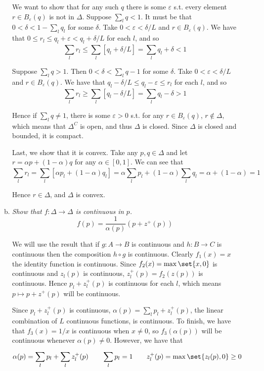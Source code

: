 \documentclass{article}
\begin{document}
\begin{enumerate}[1.]
\begin{enumerate}[a)]
        We want to show that for any such $q$ there is some $\varepsilon$ s.t. every element $r \in B_{\varepsilon}(q)$ is not in $\Delta$. Suppose $\sum^{}_{l} q < 1$.  It must be that $0 < \delta < 1 - \sum^{}_{l} q_l$ for some $\delta$. Take $0 < \varepsilon < \delta / L$ and $r \in B_{\varepsilon}(q)$. We have that $0 \le r_l \le q_l + \varepsilon < q_l + \delta / L$ for each $l$, and so
        \[
          \sum^{}_{l} r_l \le \sum^{}_{l}  \left[q_l + \delta / L\right] = \sum^{}_{l}  q_l + \delta < 1
        \]

        Suppose $\sum^{}_{l} q > 1$. Then $0 < \delta < \sum^{}_{l} q - 1$ for some $\delta$. Take $0 < \varepsilon < \delta / L$ and $r \in B_{\varepsilon}(q)$. We have that $q_l - \delta / L \le q_l - \varepsilon \le r_l$ for each $l$, and so
        \[
          \sum^{}_{l} r_l \ge \sum^{}_{l}  \left[q_l - \delta / L\right] = \sum^{}_{l} q_l - \delta > 1
        \]

        Hence if $\sum^{}_{l} q \ne 1$, there is some $\varepsilon > 0$ s.t. for any $r \in B_{\varepsilon}(q)$, $r \notin \Delta$, which means that $\Delta^C$ is open, and thus $\Delta$ is closed. Since $\Delta$ is closed and bounded, it is compact.

        Last, we show that it is convex. Take any $p, q \in \Delta$ and let $r = \alpha p + (1 - \alpha) q$ for any $\alpha \in [0, 1]$. We can see that
        \[
          \sum^{}_{l} r_l
          = \sum^{}_{l} \left[\alpha p_l + (1 - \alpha) q_l\right]
          = \alpha \sum^{}_{l} p_l + (1 - \alpha) \sum^{}_{l} q_l
          = \alpha + (1 - \alpha)
          = 1
        \]

        Hence $r \in \Delta$, and $\Delta$ is convex.

      \item \textit{Show that $f: \Delta \to \Delta$ is continuous in $p$.}
        \[
          f(p) = \dfrac{1}{\alpha(p)} \left(p + z^+(p)\right)
        \]

        \solution We will use the result that if $g: A \to B$ is continuous and $h: B \to C$ is continuous then the composition $h \circ g$ is continuous. Clearly $f_1(x) = x$ the identity function is continuous. Since $f_2(x) = \max\set{x, 0}$ is continuous and $z_l(p)$ is continuous, $z_l^+(p) = f_2(z(p))$ is continuous. Hence $p_l + z_l^+(p)$ is continuous for each $l$, which means $p \mapsto p + z^+(p)$ will be continuous.

        Since $p_l + z_l^+(p)$ is continuous, $\alpha(p) = \sum^{}_{l} p_l + z_l^+(p)$, the linear combination of $L$ continuous functions, is continuous. To finish, we have that $f_3(x) = 1 / x$ is continuous when $x \ne 0$, so $f_3(\alpha(p))$ will be continuous whenever $\alpha(p) \ne 0$. However, we have that
        \[
          \alpha(p) = \sum^{}_{l} p_l + \sum^{}_{l} z^+_l(p)
          \quad\quad
          \sum^{}_{l} p_l = 1
          \quad\quad
          z^+_l(p) = \max\set{z_l(p), 0} \ge 0
        \]


\end{enumerate}
\end{enumerate}
\end{document}
